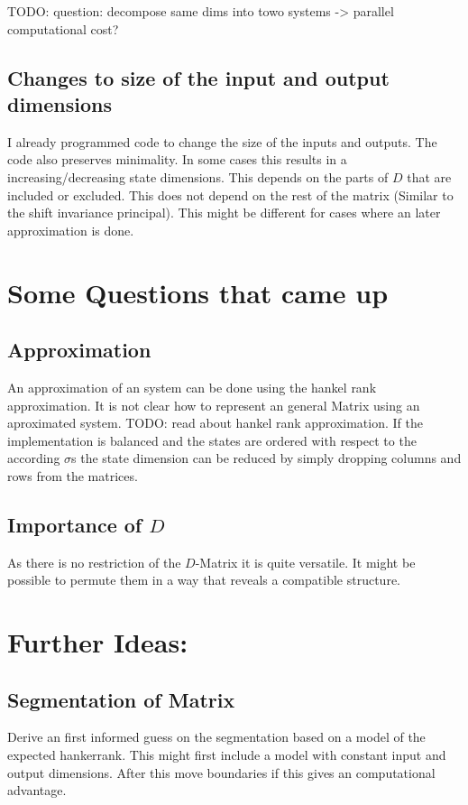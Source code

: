\documentclass[lang=ngerman,inputenc=utf8,fontsize=10pt]{ldvarticle}
\begin{document}
TODO: question: decompose same dims into towo systems -> parallel computational cost?

\subsection*{Changes to size of the input and output dimensions}
I already programmed code to change the size of the inputs and outputs. The code also preserves minimality.
In some cases this results in a increasing/decreasing state dimensions. This depends on the parts of $D$ that are included or excluded. 
This does not depend on the rest of the matrix (Similar to the shift invariance principal).
This might be different for cases where an later approximation is done.

\section{Some Questions that came up}

\subsection*{Approximation}
An approximation of an system can be done using the hankel rank approximation. It is not clear how to represent an general Matrix using an aproximated system. 
TODO: read about hankel rank approximation.
If the implementation is balanced and the states are ordered with respect to the according $\sigma$s the state dimension can be reduced by simply dropping columns and rows from the matrices.   

\subsection*{Importance of $D$}
As there is no restriction of the $D$-Matrix it is quite versatile.
It might be possible to permute them in a way that reveals a compatible structure.

\section{Further Ideas:}

\subsection*{Segmentation of Matrix}
Derive an first informed guess on the segmentation based on a model of the expected hankerrank. This might first include a model with constant input and output dimensions. 
After this move boundaries if this gives an computational advantage.
\end{document}
